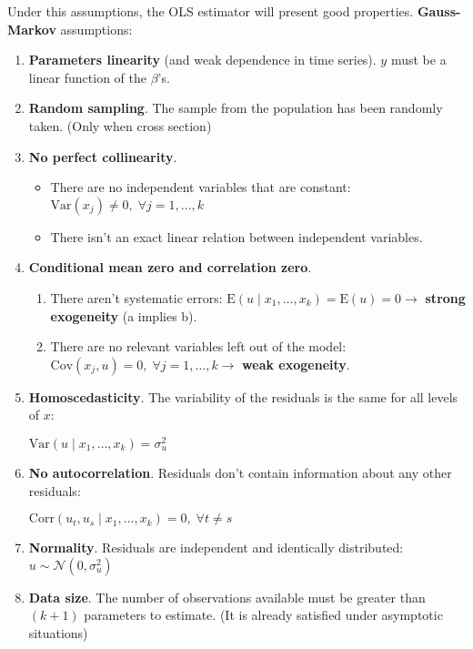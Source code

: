 \documentclass[10pt, a4paper, landscape]{article}
\newcommand{\E}{\mathrm{E}}
\newcommand{\Var}{\mathrm{Var}}
\newcommand{\Cov}{\mathrm{Cov}}
\newcommand{\Corr}{\mathrm{Corr}}
\begin{document}
\begin{multicols}{3}
		Under this assumptions, the OLS estimator will present good properties. \textbf{Gauss-Markov} assumptions:
		
		\begin{enumerate}[leftmargin=*]
			\item \textbf{Parameters linearity} (and weak dependence in time series). $y$ must be a linear function of the $\beta$'s.
			\item \textbf{Random sampling}. The sample from the population has been randomly taken. (Only when cross section)
			\item \textbf{No perfect collinearity}.
			
			\begin{itemize}[leftmargin=*]
				\item There are no independent variables that are constant: $\Var(x_{j}) \neq 0, \; \forall j = 1, \ldots, k$
				\item There isn't an exact linear relation between independent variables.
			\end{itemize}
			
			\item \textbf{Conditional mean zero and correlation zero}.
			
			\begin{enumerate}[leftmargin=*, label=\alph{*}.]
				\item There aren't systematic errors: $\E(u \mid x_{1}, \ldots, x_{k}) = \E(u) = 0 \rightarrow$ \textbf{strong exogeneity} (a implies b).
				\item There are no relevant variables left out of the model: $\Cov(x_{j}, u) = 0, \; \forall j = 1, \ldots, k \rightarrow$ \textbf{weak exogeneity}.
			\end{enumerate}
			
			\item \textbf{Homoscedasticity}. The variability of the residuals is the same for all levels of $x$:
			
			$\Var(u \mid x_{1}, \ldots, x_{k}) = \sigma^{2}_{u}$
			
			\item \textbf{No autocorrelation}. Residuals don't contain information about any other residuals:
			
			$\Corr(u_{t}, u_{s} \mid x_{1}, \ldots, x_{k}) = 0, \; \forall t \neq s$
			
			\item \textbf{Normality}. Residuals are independent and identically distributed: $u \sim \mathcal{N}(0, \sigma^{2}_{u})$
			\item \textbf{Data size}. The number of observations available must be greater than $(k + 1)$ parameters to estimate. (It is already satisfied under asymptotic situations)
		\end{enumerate}
		

\end{multicols}
\end{document}
